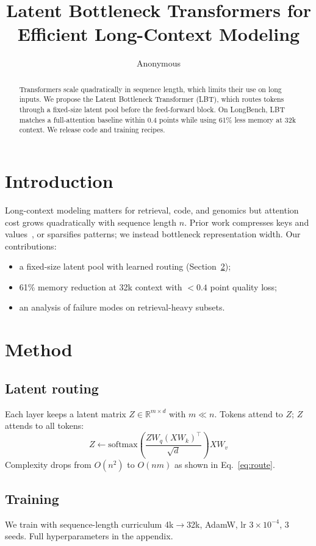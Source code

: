 \documentclass{article}
\title{Latent Bottleneck Transformers for Efficient Long-Context Modeling}
\author{Anonymous}
\begin{document}
\maketitle

\begin{abstract}
Transformers scale quadratically in sequence length, which limits their use on
long inputs. We propose the Latent Bottleneck Transformer (LBT), which routes
tokens through a fixed-size latent pool before the feed-forward block. On
LongBench, LBT matches a full-attention baseline within 0.4 points while using
61\% less memory at 32k context. We release code and training recipes.
\end{abstract}

\section{Introduction}\label{sec:intro}
Long-context modeling matters for retrieval, code, and genomics %
but attention cost grows quadratically with sequence length $n$.
Prior work compresses keys and values~\cite{vaswani2017attention}, or sparsifies
patterns; we instead bottleneck representation width.
Our contributions:
\begin{itemize}
\item a fixed-size latent pool with learned routing (Section~\ref{sec:method});
\item 61\% memory reduction at 32k context with $<0.4$ point quality loss;
\item an analysis of failure modes on retrieval-heavy subsets.
\end{itemize}

\section{Method}\label{sec:method}
\subsection{Latent routing}
Each layer keeps a latent matrix $Z \in \mathbb{R}^{m \times d}$ with $m \ll n$.
Tokens attend to $Z$; $Z$ attends to all tokens:
\begin{equation}
Z \leftarrow \mathrm{softmax}\!\left(\frac{Z W_q (X W_k)^\top}{\sqrt{d}}\right) X W_v
\label{eq:route}
\end{equation}
Complexity drops from $O(n^2)$ to $O(nm)$ as shown in Eq.~\eqref{eq:route}.

\subsection{Training}
We train with sequence-length curriculum 4k$\to$32k, AdamW, lr $3\times10^{-4}$,
3 seeds. Full hyperparameters in the appendix.
\end{document}
